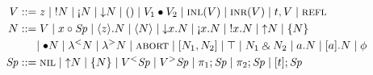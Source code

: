 \begin{align*}
V & ::= z                     %
   \mid \tbangr{N}            %
   \mid \tgnabr{N}            %
   \mid \tdownr{N}            %
%
   \mid \toner
   \mid \tfuser{V_1}{V_2}     %
%  
   \mid \tinl{V}
   \mid \tinr{V}
   \mid \texistsr{t}{V}
   \mid \tunifr
 \\
N & ::= \tfocusr{V}           %
   \mid \tfocusl{x}{\Sp}      %
   \mid \tetap{z}{N}          %
   \mid \tetan{N}             %
   \mid \tdownl{x}{N}         %
   \mid \tgnabl{x}{N}         %
   \mid \tbangl{x}{N}         %
   \mid \tupr{N}              %
   \mid \tlaxr{N}             %
\\ & ~~~~ %
   \mid \tfusel{N}            %
   \mid \tlaml{N}             %
   \mid \tlamr{N}             %
%
   \mid \tabort
   \mid \toplusl{N_1}{N_2}    %
   \mid \ttopr 
   \mid \twithr{N_1}{N_2}     %
   \mid \texistsl{a}{N}
   \mid \tforallr{a}{N}
   \mid \phi
\\
\Sp & ::= \tnil               %
   \mid \tupl{N}              %
   \mid \tlaxl{N}             %
   \mid \tappl{V}{\Sp}        %
   \mid \tappr{V}{\Sp}        %
   \mid \tpione{\Sp}          %
   \mid \tpitwo{\Sp}          %
   \mid \tforalll{t}{\Sp}
\end{align*}
